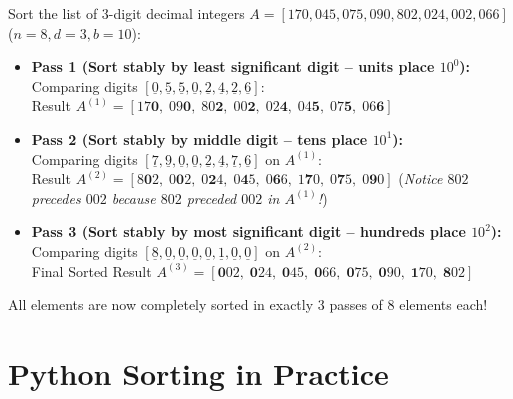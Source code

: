 \documentclass[11pt,a4paper]{article}
\begin{document}
\begin{examplebox}
Sort the list of 3-digit decimal integers $A = [170, 045, 075, 090, 802, 024, 002, 066]$ ($n = 8, d = 3, b = 10$):
\begin{itemize}[itemsep=3pt]
    \item \textbf{Pass 1 (Sort stably by least significant digit -- units place $10^0$):}\\
    Comparing digits $[\underline{0}, \underline{5}, \underline{5}, \underline{0}, \underline{2}, \underline{4}, \underline{2}, \underline{6}]$:\\
    Result $A^{(1)} = [17\mathbf{0},\; 09\mathbf{0},\; 80\mathbf{2},\; 00\mathbf{2},\; 02\mathbf{4},\; 04\mathbf{5},\; 07\mathbf{5},\; 06\mathbf{6}]$
    \item \textbf{Pass 2 (Sort stably by middle digit -- tens place $10^1$):}\\
    Comparing digits $[\underline{7}, \underline{9}, \underline{0}, \underline{0}, \underline{2}, \underline{4}, \underline{7}, \underline{6}]$ on $A^{(1)}$:\\
    Result $A^{(2)} = [8\mathbf{0}2,\; 0\mathbf{0}2,\; 0\mathbf{2}4,\; 0\mathbf{4}5,\; 0\mathbf{6}6,\; 1\mathbf{7}0,\; 0\mathbf{7}5,\; 0\mathbf{9}0]$ \quad (\emph{Notice $802$ precedes $002$ because $802$ preceded $002$ in $A^{(1)}$!})
    \item \textbf{Pass 3 (Sort stably by most significant digit -- hundreds place $10^2$):}\\
    Comparing digits $[\underline{8}, \underline{0}, \underline{0}, \underline{0}, \underline{0}, \underline{1}, \underline{0}, \underline{0}]$ on $A^{(2)}$:\\
    Final Sorted Result $A^{(3)} = [\mathbf{0}02,\; \mathbf{0}24,\; \mathbf{0}45,\; \mathbf{0}66,\; \mathbf{0}75,\; \mathbf{0}90,\; \mathbf{1}70,\; \mathbf{8}02]$
\end{itemize}
All elements are now completely sorted in exactly 3 passes of 8 elements each!
\end{examplebox}

\newpage
\section{Python Sorting in Practice}
\end{document}
